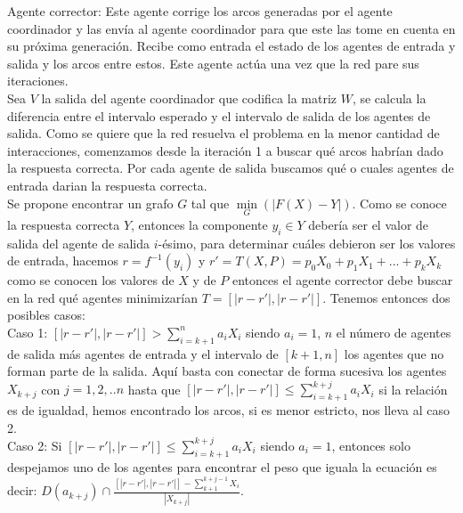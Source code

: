         Agente corrector: Este agente corrige los arcos generadas por el agente coordinador y las envía al agente coordinador para que este las tome en cuenta en su próxima generación. Recibe como entrada el estado de los agentes de entrada y salida y los arcos entre estos. Este agente actúa una vez que la red pare sus iteraciones. \\

        Sea $V$ la salida del agente coordinador que codifica la matriz $W$, se calcula la diferencia entre el intervalo esperado y el intervalo de salida de los agentes de salida.
        Como se quiere que la red resuelva el problema en la menor cantidad de interacciones, comenzamos desde la iteración 1 a buscar qué arcos habrían dado la
        respuesta correcta. Por cada agente de salida buscamos qué o cuales agentes de entrada darian la respuesta correcta.  \\

        Se propone encontrar un grafo $G$ tal que $\underset{G}{\min}(|F(X)-Y|)$. Como se conoce la respuesta correcta $Y$, entonces la componente $y_i \in Y$ debería ser el valor de salida del agente de salida $i$-ésimo, para determinar cuáles debieron ser los valores de entrada, hacemos $r=f^{-1}(y_i)$ y $r'=T(X,P)=p_0X_0 + p_1X_1 +...+p_kX_k$ como se conocen los valores de $X$ y de $P$
        entonces el agente corrector debe buscar en la red qué agentes minimizarían $T=[|r-r'|,|r-r'|]$. Tenemos entonces dos posibles casos: \\

        Caso 1: $[|r-r'|,|r-r'|] > \sum_{i=k+1}^{n} a_iX_i$ siendo $a_i=1$, $n$ el número de agentes de salida más agentes de entrada y el intervalo de $[k+1,n]$ los agentes
        que no forman parte de la salida. Aquí basta con conectar de forma sucesiva los agentes $X_{k+j}$ con $j=1,2,..n$ hasta que $[|r-r'|,|r-r'|] \leqslant \sum_{i=k+1}^{k+j} a_iX_i$ si la relación es de igualdad, hemos encontrado los arcos,
         si es menor estricto, nos lleva al caso 2.\\

        Caso 2: Si $[|r-r'|,|r-r'|] \leqslant \sum_{i=k+1}^{k+j} a_iX_i$ siendo $a_i=1$, entonces solo despejamos uno de los agentes para encontrar el peso que iguala la ecuación
        es decir: $D(a_{k+j}) \cap \frac{[|r-r'|,|r-r'|] - \sum_{k+1}^{k+j-1} X_i}{|X_{k+j}|}$.\\

